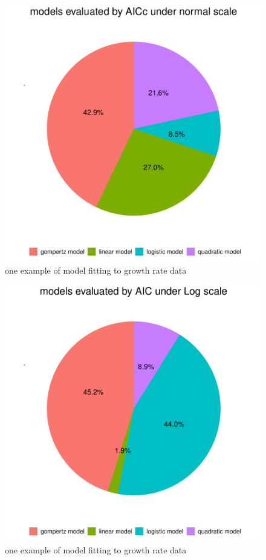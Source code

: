 \documentclass[11pt]{article}
\begin{document}
\begin{figure}[H]
    \centering
    \includegraphics[scale=0.3]{AICc_norm.pdf}
    \caption{one example of model fitting to growth rate data}
    \label{fig.3}
\end{figure}

\begin{figure}[H]
    \centering
    \includegraphics[scale=0.3]{AIC_Log.pdf}
    \caption{one example of model fitting to growth rate data}
    \label{fig.4}
\end{figure}
\end{document}
